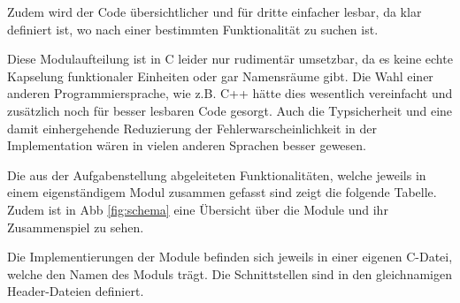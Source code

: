 \documentclass[final,a4paper,11pt,notitlepage,halfparskip]{scrreprt}
\begin{document}
Zudem wird der Code übersichtlicher und für dritte einfacher lesbar, da klar
definiert ist, wo nach einer bestimmten Funktionalität zu suchen ist.

Diese Modulaufteilung ist in C leider nur rudimentär umsetzbar, da es keine
echte Kapselung funktionaler Einheiten oder gar Namensräume gibt. Die Wahl einer
anderen Programmiersprache, wie z.B. C++ hätte dies wesentlich vereinfacht und
zusätzlich noch für besser lesbaren Code gesorgt. Auch die Typsicherheit und
eine damit einhergehende Reduzierung der Fehlerwarscheinlichkeit in der
Implementation wären in vielen anderen Sprachen besser gewesen.

Die aus der Aufgabenstellung abgeleiteten Funktionalitäten, welche jeweils in
einem eigenständigem Modul zusammen gefasst sind zeigt die folgende Tabelle.
Zudem ist in Abb \ref{fig:schema} eine Übersicht über die Module und ihr
Zusammenspiel zu sehen.

Die Implementierungen der Module befinden sich jeweils in einer eigenen C-Datei,
welche den Namen des Moduls trägt. Die Schnittstellen sind in den gleichnamigen
Header-Dateien definiert.

\vspace{3mm}
\end{document}

